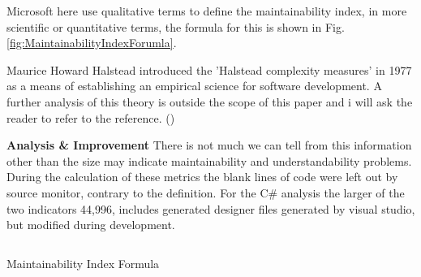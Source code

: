 		\normalsize
		Microsoft here use qualitative terms to define the maintainability index, in more scientific or quantitative terms, the formula
		for this is shown in Fig. \ref{fig:MaintainabilityIndexForumla}.
		
		\begin{multicols}{2}
		
			\vspace{25mm}
			Maurice Howard Halstead introduced the 'Halstead complexity measures' in 1977 as a means of establishing an empirical science for software development. 
			A further analysis of this theory is outside the scope of this paper and i will ask the reader to refer to the reference. (\citet{Halstead})
			\newline
			\newline

			\large{\bfseries{Analysis \& Improvement}}
			\newline
			\normalsize					
			There is not much we can tell from this information other than the size may indicate maintainability and understandability problems.
			\newline
			\newline
			During the calculation of these metrics the blank lines of code were left out by source monitor, contrary to the definition.  
			For the C\# analysis the larger of the two indicators 44,996, includes generated designer files generated by visual studio, but modified during development.
			\newline
			
		\columnbreak

		\vspace{-15mm}
		\begin{figurehere}
			\inputminted[linenos=true,fontsize=\footnotesize,tabsize=2,xleftmargin=1cm]{csharp}{pages/chapter4/smippets/mi.txt}
			\vspace{-5mm}
			\caption{Maintainability Index Formula}
			\label{fig:MaintainabilityIndexForumla}
		\end{figurehere}		


\end{multicols}
